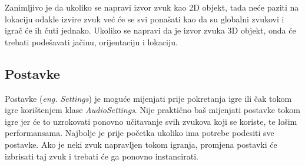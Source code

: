 Zanimljivo je da ukoliko se napravi izvor zvuk kao 2D objekt, tada neće paziti na lokaciju odakle izvire zvuk već će se svi ponašati kao da su globalni zvukovi i igrač će ih čuti jednako. Ukoliko se napravi da je izvor zvuka 3D objekt, onda će trebati podešavati jačinu, orijentaciju i lokaciju.

\subsection{Postavke}
Postavke (\emph{eng. Settings}) je moguće mijenjati prije pokretanja igre ili čak tokom igre korištenjem klase \emph{AudioSettings}. Nije praktično baš mijenjati postavke tokom igre jer će to uzrokovati ponovno učitavanje svih zvukova koji se koriste, te lošim performansama. Najbolje je prije početka ukoliko ima potrebe podesiti sve postavke. Ako je neki zvuk napravljen tokom igranja, promjena postavki će izbrisati taj zvuk i trebati će ga ponovno instancirati.